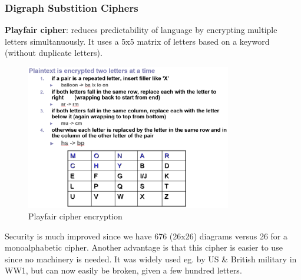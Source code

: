 \documentclass[11pt,british,faculty=ea,layout=titlefont,underline=false,titleUppercase=true,titleUnderline=true,hidelinks]{ugent2016-report}
\begin{document}
			\subsubsection{Digraph Substition Ciphers} \label{subsub:digraph-substitution-ciphers}
				\textbf{Playfair cipher}: reduces predictability of language by encrypting multiple letters simultanuously. It uses a 5x5 matrix of letters based on a keyword (without duplicate letters).
				\begin{figure}[h]
					\centering
					\includegraphics[width=0.8\textwidth]{images/playfair-cipher-encryption.png}
					\caption{Playfair cipher encryption}
				\end{figure}
				Security is much improved since we have 676 (26x26) diagrams versus 26 for a monoalphabetic cipher. Another advantage is that this cipher is easier to use since no machinery is needed.
				It was widely used eg. by US \& British military in WW1, but can now easily be broken, given a few hundred letters.
\end{document}
